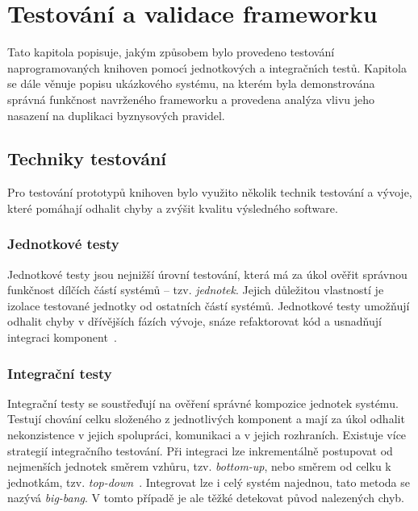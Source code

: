 

\chapter{Testování a validace frameworku}\label{ch:testovani}

Tato kapitola popisuje, jak\'ym způsobem bylo provedeno
testování naprogramovan\'ych knihoven pomoc\'{\i}
jednotkov\'ych a integračn\'{\i}ch testů.
Kapitola se dále věnuje popisu ukázkového systému, na kterém
byla demonstrována správná funkčnost navrženého frameworku
a provedena analýza vlivu jeho nasazení na duplikaci
byznysových pravidel.

\section{Techniky testování}

Pro testování prototypů knihoven bylo využito několik technik testování
a vývoje, které pomáhají odhalit chyby a zvýšit kvalitu výsledného software.

\subsection{Jednotkové testy}

Jednotkové testy jsou nejnižší úrovní testování, která má za úkol ověřit správnou
funkčnost dílčích částí systémů -- tzv. \textit{jednotek}. Jejich důležitou vlastností je
izolace testované jednotky od ostatních částí systémů. Jednotkové testy umožňují
odhalit chyby v dřívějších fázích vývoje, snáze refaktorovat kód a usnadňují
integraci komponent~\cite{luo2001software}.

\subsection{Integrační testy}

Integrační testy se soustřeďují na ověření správné kompozice jednotek systému. Testují chování celku
složeného z jednotlivých komponent a mají za úkol odhalit nekonzistence v jejich spolupráci, komunikaci
a v jejich rozhraních. Existuje více strategií integračního testování. Při integraci
lze inkrementálně postupovat od nejmenších jednotek směrem vzhůru, tzv. \textit{bottom-up}, nebo směrem od
celku k jednotkám, tzv. \textit{top-down}~\cite{graham2008foundations}. Integrovat lze i celý systém najednou,
tato metoda se nazývá \textit{big-bang}. V tomto případě je ale těžké detekovat původ nalezených chyb.

